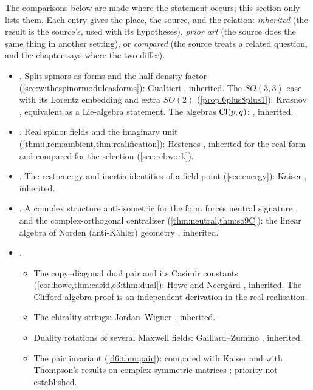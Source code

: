 The comparisons below are made where the statement occurs; this section only lists them. Each entry gives the place, the source, and the
relation: \emph{inherited} (the result is the source's, used with its hypotheses), \emph{prior art} (the source does the same thing in
another setting), or \emph{compared} (the source treats a related question, and the chapter says where the two differ).
\begin{itemize}[leftmargin=1.6em]
\item {}. Split spinors as forms and the half-density factor (\cref{sec:w:thespinormoduleasforms}): Gualtieri
\cite{Gualtieri03,Gualtieri11}, inherited. The $SO(3,3)$ case with its Lorentz embedding and extra $SO(2)$ (\cref{prop:6plus8plus1}): Krasnov
\cite[\S4]{Krasnov18}, equivalent as a Lie-algebra statement. The algebras $\mathrm{Cl}(p,q)$: \cite{AtiyahBottShapiro64,Floerchinger21}, inherited.
\item {}. Real spinor fields and the imaginary unit (\cref{thm:i,rem:ambient,thm:realification}): Hestenes
\cite{Hestenes67}, inherited for the real form and compared for the selection (\cref{sec:rel:work}).
\item {}. The rest-energy and inertia identities of a field point (\cref{sec:energy}): Kaiser \cite{Kaiser11}, inherited.
\item {}. A complex structure anti-isometric for the form forces neutral signature, and the complex-orthogonal
centraliser (\cref{thm:neutral,thm:so9C}): the linear algebra of Norden (anti-K\"ahler) geometry \cite{BorowiecFrancavigliaVolovich00},
inherited.
\item {}.
  \begin{itemize}
  \item The copy--diagonal dual pair and its Casimir constants (\cref{cor:howe,thm:casid,e3:thm:dual}): Howe \cite{Howe89} and Neerg{\aa}rd
  \cite{Neergard19,Neergard20}, inherited. The Clifford-algebra proof is an independent derivation in the real realisation.
  \item The chirality strings: Jordan--Wigner \cite{JordanWigner28}, inherited.
  \item Duality rotations of several Maxwell fields: Gaillard--Zumino \cite{GaillardZumino81}, inherited.
  \item The pair invariant (\cref{d6:thm:pair}): compared with Kaiser \cite{Kaiser11} and with Thompson's results on complex symmetric matrices
  \cite{Thompson79}; priority not established.

\end{itemize}
\end{itemize}
